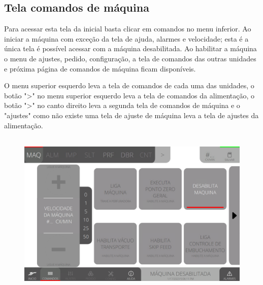 \thispagestyle{fancy}

\vspace*{40 pt}

\subsection{Tela comandos de máquina}\label{telaComandosMaquina}

Para acessar esta tela da inicial basta clicar em comandos no menu inferior. Ao iniciar a máquina com exceção da tela de ajuda, alarmes e velocidade; esta é a única tela é possível acessar com a máquina desabilitada. Ao habilitar a máquina o menu de ajustes, pedido, configuração, a tela de comandos das outras unidades e próxima página de comandos de máquina ficam disponíveis.

O menu superior esquerdo leva a tela de comandos de cada uma das unidades, o botão "\textgreater" no menu superior esquerdo leva a tela de comandos da alimentação, o botão "\textgreater" no canto direito leva a segunda tela de comandos de máquina e o "ajustes" como não existe uma tela de ajuste de máquina leva a tela de ajustes da alimentação.

\vspace*{\fill}

\begin{figure}[h]
  \centering
  \includegraphics[width=480px,height=300px]{src/imagesFlexo/02-machine/e-Tela-Principal.png}
\end{figure}

\vspace*{\fill}

\newpage
\thispagestyle{fancy}

\vspace*{40 pt}

